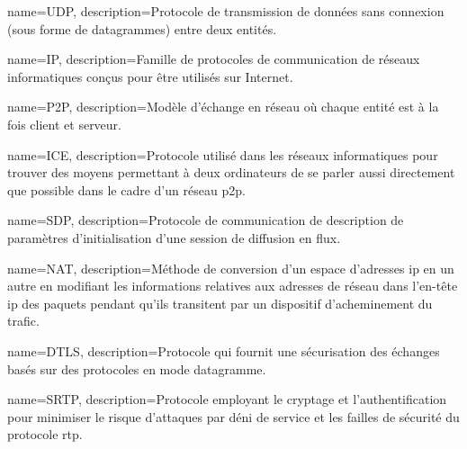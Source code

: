 
{
  name=UDP,
  description={Protocole de transmission de données sans connexion (sous forme de datagrammes) entre deux entités.}
}

{
  name=IP,
  description={Famille de protocoles de communication de réseaux informatiques conçus pour être utilisés sur Internet.}
}

{
  name=P2P,
  description={Modèle d'échange en réseau où chaque entité est à la fois client et serveur.}
}

{
  name=ICE,
  description={Protocole utilisé dans les réseaux informatiques pour trouver des moyens permettant à deux ordinateurs de se parler aussi directement que possible dans le cadre d'un réseau \gls{p2p}.}
}

{
  name=SDP,
  description={Protocole de communication de description de paramètres d'initialisation d'une session de diffusion en flux.}
}

{
  name=NAT,
  description={Méthode de conversion d'un espace d'adresses \gls{ip} en un autre en modifiant les informations relatives aux adresses de réseau dans l'en-tête \gls{ip} des paquets pendant qu'ils transitent par un dispositif d'acheminement du trafic.}
}

{
  name=DTLS,
  description={Protocole qui fournit une sécurisation des échanges basés sur des protocoles en mode datagramme.}
}

{
  name=SRTP,
  description={Protocole employant le cryptage et l'authentification pour minimiser le risque d'attaques par déni de service et les failles de sécurité du protocole \gls{rtp}.}
}

